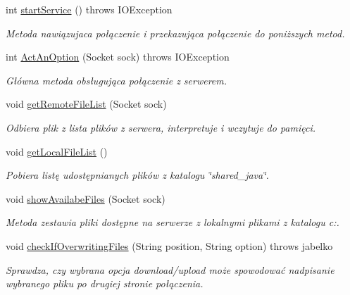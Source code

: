 \begin{DoxyCompactItemize}
\item 
int \hyperlink{classTCPshareClient_a59c2ec1caa18e5081192925e91f9717e}{start\+Service} ()  throws I\+O\+Exception 
\begin{DoxyCompactList}\small\item\em Metoda nawiązujaca połączenie i przekazująca połączenie do poniższych metod. \end{DoxyCompactList}\item 
int \hyperlink{classTCPshareClient_a33bb90418d922955e2c86ae857e9dcea}{Act\+An\+Option} (Socket sock)  throws I\+O\+Exception 
\begin{DoxyCompactList}\small\item\em Główna metoda obsługująca połączenie z serwerem. \end{DoxyCompactList}\item 
void \hyperlink{classTCPshareClient_a4d9936ebefa607fe1d3d3efef79b5e40}{get\+Remote\+File\+List} (Socket sock)
\begin{DoxyCompactList}\small\item\em Odbiera plik z lista plików z serwera, interpretuje i wczytuje do pamięci. \end{DoxyCompactList}\item 
void \hyperlink{classTCPshareClient_a919fae8dbdeda86954c85230283be904}{get\+Local\+File\+List} ()
\begin{DoxyCompactList}\small\item\em Pobiera listę udostępnianych plików z katalogu {\itshape \char`\"{}shared\+\_\+java\char`\"{}}. \end{DoxyCompactList}\item 
void \hyperlink{classTCPshareClient_a90c2aa41a958d8e110ee9032577a1d87}{show\+Availabe\+Files} (Socket sock)
\begin{DoxyCompactList}\small\item\em Metoda zestawia pliki dostępne na serwerze z lokalnymi plikami z katalogu c\+:. \end{DoxyCompactList}\item 
void \hyperlink{classTCPshareClient_a4af6bd36674c0e92f5f49bac5b8759db}{check\+If\+Overwriting\+Files} (String position, String option)  throws jabelko 
\begin{DoxyCompactList}\small\item\em Sprawdza, czy wybrana opcja {\itshape download/upload} może spowodować nadpisanie wybranego pliku po drugiej stronie połączenia. \end{DoxyCompactList}\item 

\end{DoxyCompactItemize}
